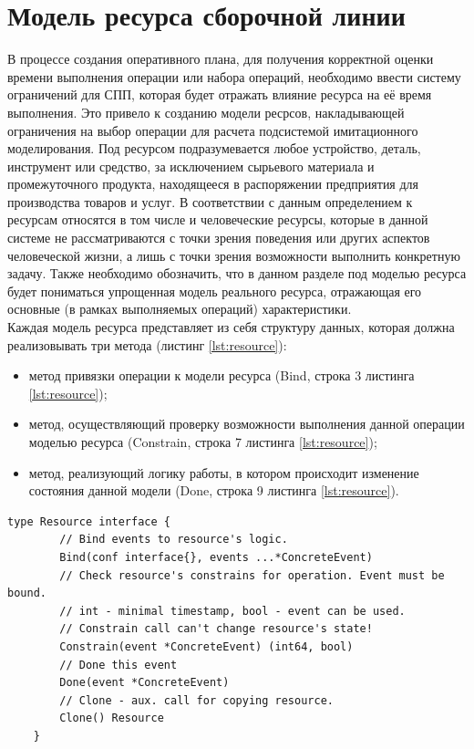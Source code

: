 \section{Модель ресурса сборочной линии}
\indent В процессе создания оперативного плана, для получения корректной оценки времени выполнения операции или набора операций, необходимо ввести систему ограничений для СПП, которая будет отражать влияние ресурса на её время выполнения.
Это привело к созданию модели ресрсов, накладывающей ограничения на выбор операции для расчета подсистемой имитационного моделирования.
Под ресурсом подразумевается любое устройство, деталь, инструмент или средство, за исключением сырьевого материала и промежуточного продукта, находящееся в распоряжении предприятия для производства товаров и услуг.
В соответствии с данным определением к ресурсам относятся в том числе и человеческие ресурсы, которые в данной системе не рассматриваются с точки зрения поведения или других аспектов человеческой жизни, а лишь с точки зрения возможности выполнить конкретную задачу.
Также необходимо обозначить, что в данном разделе под моделью ресурса будет пониматься упрощенная модель реального ресурса, отражающая его основные (в рамках выполняемых операций) характеристики.\\
\indent Каждая модель ресурса представляет из себя структуру данных, которая должна реализовывать три метода (листинг \ref{lst:resource}):
\begin{itemize}
	\item метод привязки операции к модели ресурса (Bind, строка 3 листинга \ref{lst:resource});
	\item метод, осуществляющий проверку возможности выполнения данной операции моделью ресурса (Constrain, строка 7 листинга \ref{lst:resource});
	\item метод, реализующий логику работы, в котором происходит изменение состояния данной модели (Done, строка 9 листинга \ref{lst:resource}).
\end{itemize}
\begin{lstlisting}[caption={Интерфейс ресурса},label={lst:resource},language=Golang]
	type Resource interface {
		// Bind events to resource's logic.
		Bind(conf interface{}, events ...*ConcreteEvent)
		// Check resource's constrains for operation. Event must be bound.
		// int - minimal timestamp, bool - event can be used.
		// Constrain call can't change resource's state!
		Constrain(event *ConcreteEvent) (int64, bool)
		// Done this event
		Done(event *ConcreteEvent)
		// Clone - aux. call for copying resource.
		Clone() Resource
	}
\end{lstlisting}

